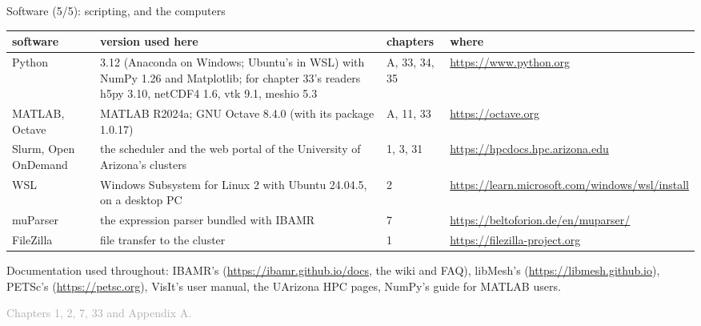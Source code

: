 \documentclass[aspectratio=169,11pt]{beamer}
\newcommand{\sourcecredit}[1]{\vfill\begin{flushright}\tiny\textcolor{DarkGray}{#1}\end{flushright}}
\begin{document}
\begin{frame}{Software (5/5): scripting, and the computers}
\label{fr:sw3}
\scriptsize
\renewcommand{\arraystretch}{1.08}
\begin{tabular}{@{}L{0.14\textwidth}L{0.41\textwidth}L{0.11\textwidth}L{0.25\textwidth}@{}}
\toprule
software & version used here & chapters & where\\
\midrule
Python & 3.12 (Anaconda on Windows; Ubuntu's in WSL) with NumPy 1.26 and Matplotlib; for chapter 33's readers h5py 3.10, netCDF4 1.6, vtk 9.1, meshio 5.3 & A, 33, 34, 35 & \url{https://www.python.org}\\
MATLAB, Octave & MATLAB R2024a; GNU Octave 8.4.0 (with its  package 1.0.17) & A, 11, 33 & \url{https://octave.org}\\
Slurm, Open OnDemand & the scheduler and the web portal of the University of Arizona's clusters & 1, 3, 31 & \url{https://hpcdocs.hpc.arizona.edu}\\
WSL & Windows Subsystem for Linux 2 with Ubuntu 24.04.5, on a desktop PC & 2 & \url{https://learn.microsoft.com/windows/wsl/install}\\
muParser & the expression parser bundled with IBAMR & 7 & \url{https://beltoforion.de/en/muparser/}\\
FileZilla & file transfer to the cluster & 1 & \url{https://filezilla-project.org}\\
\bottomrule
\end{tabular}
\vspace{1mm}

\footnotesize Documentation used throughout: IBAMR's (\url{https://ibamr.github.io/docs}, the wiki and FAQ), libMesh's (\url{https://libmesh.github.io}), PETSc's (\url{https://petsc.org}), VisIt's user manual, the UArizona HPC pages, NumPy's guide for MATLAB users.
\sourcecredit{Chapters 1, 2, 7, 33 and Appendix A.}
\end{frame}
\end{document}
